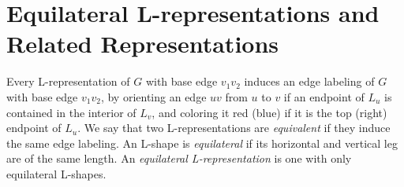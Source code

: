 \documentclass{llncs}
\begin{document}
\section{Equilateral L-representations and Related Representations}\label{sec:equilateral}

Every L-representation of $G$ with base edge $v_1v_2$ induces an edge labeling of $G$ with base edge $v_1v_2$, by orienting an edge $uv$ from $u$ to $v$ if an endpoint of $L_u$ is contained in the interior of $L_v$, and coloring it red (blue) if it is the top (right) endpoint of $L_u$. We say that two L-representations are \emph{equivalent} if they induce the same edge labeling. An L-shape is \emph{equilateral} if its horizontal and vertical leg are of the same length. An \emph{equilateral L-representation} is one with only equilateral L-shapes.
  
\end{document}
